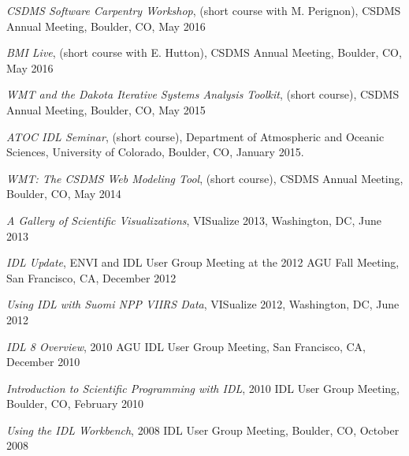 \begin{enumerate}[{[}1{]}]
  \item \textit{CSDMS Software Carpentry Workshop}, (short course with
    M. Perignon), CSDMS Annual Meeting, Boulder, CO, May 2016

  \item \textit{BMI Live}, (short course with E. Hutton),
    CSDMS Annual Meeting, Boulder, CO, May 2016

  \item \textit{WMT and the Dakota Iterative Systems Analysis Toolkit},
    (short course), CSDMS Annual Meeting, Boulder, CO, May 2015

  \item \textit{ATOC IDL Seminar}, (short course), Department of
    Atmospheric and Oceanic Sciences, University of Colorado, Boulder,
    CO, January 2015.

  \item \textit{WMT: The CSDMS Web Modeling Tool}, (short course), CSDMS
    Annual Meeting, Boulder, CO, May 2014

  \item \textit{A Gallery of Scientific Visualizations}, {VISualize} 2013,
    Washington, DC, June 2013

  \item \textit{IDL Update}, ENVI and IDL User Group Meeting at the 2012
    AGU Fall Meeting, San Francisco, CA, December 2012

  \item \textit{Using IDL with Suomi NPP VIIRS Data}, {VISualize} 2012,
    Washington, DC, June 2012

  \item \textit{IDL 8 Overview}, 2010 AGU IDL User Group Meeting, San
    Francisco, CA, December 2010

  \item \textit{Introduction to Scientific Programming with IDL}, 2010 IDL
    User Group Meeting, Boulder, CO, February 2010

  \item \textit{Using the IDL Workbench}, 2008 IDL User Group Meeting,
    Boulder, CO, October 2008

\end{enumerate}
